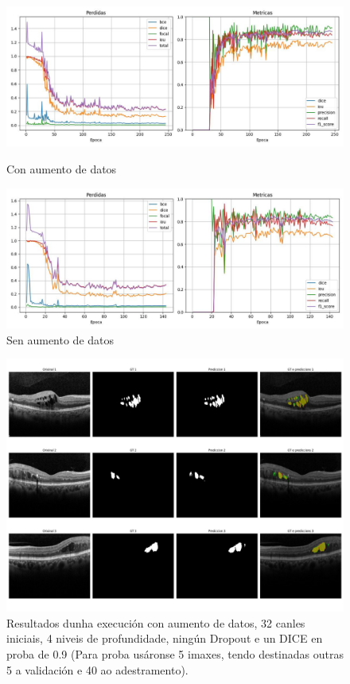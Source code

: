 \documentclass{article}
\begin{document}
\begin{itemize}
\begin{figure}[htbp]
    \centering
    \begin{minipage}{0.45\textwidth}
    \centering
        \includegraphics[width=\linewidth]{figuras/ADT.jpg}
        \caption*{Con aumento de datos}
    \end{minipage}
    \hfill
    \begin{minipage}{0.45\textwidth}
    \centering
        \includegraphics[width=\linewidth]{figuras/ADF.jpg}
        \caption*{Sen aumento de datos}
    \end{minipage}
\end{figure}

\end{itemize}

\begin{figure}[H]
	\centering
	\includegraphics[width=\linewidth]{figuras/conclusion.jpg}
	\caption{Resultados dunha execución con aumento de datos, 32 canles iniciais, 4 niveis de profundidade, ningún Dropout e un DICE en proba de 0.9 (Para proba usáronse 5 imaxes, tendo destinadas outras 5 a validación e 40 ao adestramento). }
\end{figure}
\end{document}
